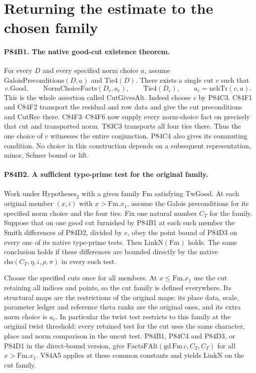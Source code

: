 \section{Returning the estimate to the chosen family}

\paragraph{P84B1. The native good-cut existence theorem.}
For every $D$ and every specified norm choice $a$, assume
$\mathrm{GaloisPreconditions}(D,a)$ and $\mathrm{Tie4}(D)$.
There exists a single cut $c$ such that
\[
  c.\mathrm{Good},\qquad
  \mathrm{NormChoiceFacts}(D_c,a_c),\qquad
  \mathrm{Tie4}(D_c),
  \qquad a_c=\mathrm{nchTr}(c,a).
\]
This is the whole assertion called $\mathrm{CutGivesAlt}$.
Indeed choose $c$ by P84C3. C84F1 and C84F2 transport the
residual and row data and give the cut preconditions and
$\mathrm{CutRec}$ there. C84F3--C84F6 now supply every
norm-choice fact on precisely that cut and transported norm.
T83C3 transports all four ties there. Thus the one choice of
$c$ witnesses the entire conjunction. P84C4 also gives its
commuting condition. No choice in this construction depends on
a subsequent representation, minor, Selmer bound or lift.

\paragraph{P84B2. A sufficient type-prime test for the original family.}
Work under $\mathrm{Hypotheses}_2$ with a given family
$\mathrm{Fm}$ satisfying $\mathrm{TwGood}$. At each original
member $(x,i)$ with $x>\mathrm{Fm}.x_1$, assume the Galois
preconditions for its specified norm choice and the four ties.
Fix one natural number $C_T$ for the family. Suppose that on
one good cut furnished by P84B1 at each such member the Smith
differences of P84D2, divided by $e$, obey the point bound
of P84D3 on every one of its native type-prime tests. Then
$\mathrm{LinkN}(\mathrm{Fm})$ holds. The same conclusion holds
if these differences are bounded directly by the native
$\mathrm{rhs}(C_T,\eta,i,\rho,\pi)$ in every such test.

Choose the specified cuts once for all members. At $x\le
\mathrm{Fm}.x_1$ use the cut retaining all indices and points,
so the cut family is defined everywhere. Its structural maps are
the restrictions of the original maps: its place data, scale,
parameter ledger and reference theta ranks are the original
ones, and its extra norm choice is $a_c$. In particular the
twist test restricts to this family at the original twist
threshold: every retained test for the cut uses the same
character, place and norm comparison in the uncut test.
P84B1, P84C4 and P84D3, or P84D1 in the direct-bound version,
give $\mathrm{FactsFAlt}(\mathrm{gd}\,\mathrm{Fm}\,c,C_T,C_T)$
for all $x>\mathrm{Fm}.x_1$. V84A5 applies at these common
constants and yields $\mathrm{LinkN}$ on the cut family.

